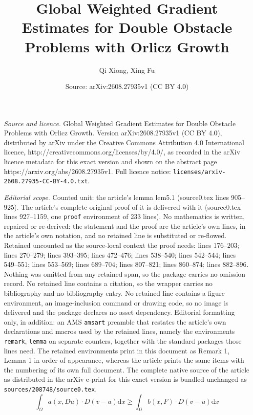 \documentclass[10pt,a4paper]{amsart}
\title{Global Weighted Gradient Estimates for Double Obstacle Problems with Orlicz Growth}
\author{Qi Xiong, Xing Fu}
\date{Source: arXiv:2608.27935v1 (CC BY 4.0)}
\begin{document}
\maketitle

\noindent\emph{Source and licence.} Global Weighted Gradient Estimates for Double Obstacle Problems with Orlicz Growth. Version arXiv:2608.27935v1 (CC BY 4.0), distributed by arXiv under the Creative Commons Attribution 4.0 International licence, http://creativecommons.org/licenses/by/4.0/, as recorded in the arXiv licence metadata for this exact version and shown on the abstract page https://arxiv.org/abs/2608.27935v1. Full licence notice: \texttt{licenses/arxiv-2608.27935-CC-BY-4.0.txt}.\par\smallskip

\noindent\textit{Editorial scope.} Counted unit: the article's lemma lem5.1 (source0.tex lines 905--925). The article's complete original proof of it is delivered with it (source0.tex lines 927--1159, one \texttt{proof} environment of 233 lines). No mathematics is written, repaired or re-derived: the statement and the proof are the article's own lines, in the article's own notation, and no retained line is substituted or re-flowed.  Retained uncounted as the source-local context the proof needs: lines 176--203; lines 270--279; lines 393--395; lines 472--476; lines 538--540; lines 542--544; lines 549--551; lines 553--569; lines 689--704; lines 807--821; lines 860--874; lines 882--896.  Nothing was omitted from any retained span, so the package carries no omission record.  No retained line contains a citation, so the wrapper carries no bibliography and no bibliography entry.  No retained line contains a figure environment, an image-inclusion command or drawing code, so no image is delivered and the package declares no asset dependency.  Editorial formatting only, in addition: an AMS \texttt{amsart} preamble that restates the article's own declarations and macros used by the retained lines, namely the environments \texttt{remark}, \texttt{lemma} on separate counters, together with the standard packages those lines need.  The retained environments print in this document as Remark 1, Lemma 1 in order of appearance, whereas the article prints the same items with the numbering of its own full document.  The complete native source of the article as distributed in the arXiv e-print for this exact version is bundled unchanged as \texttt{sources/208748/source0.tex}.
\begin{equation}\label{u}
	\int_{\Omega}  a(x, D u) \cdot D(v-u) \mathrm{d} x \geqslant \int_{\Omega} b(x, F ) \cdot D(v-u) \mathrm{d} x  
\end{equation}
\end{document}
